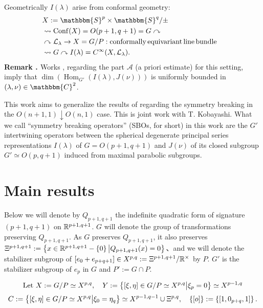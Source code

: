 \documentclass[12pt]{article} %
\newcommand{\assign}{:=}
\newcommand{\tmop}[1]{\ensuremath{\operatorname{#1}}}
\theoremstyle{definition}
\theoremstyle{exampstyle} \newtheorem{examp}[theorem]{Theorem}
\newcommand{\tmtextbf}[1]{{\bfseries{#1}}}
\renewcommand{\setminus}{-}
\begin{document}
 Geometrically $I (\lambda)$ arise from conformal
geometry:
\begin{eqnarray}
  & X \assign \mathbbm{S}^p \times \mathbbm{S}^q / \pm &  \nonumber\\
  & \rightsquigarrow \tmop{Conf} (X) = O (p + 1, q + 1) = G \curvearrowright
  &  \nonumber\\
  & \curvearrowright \mathcal{L}_{\lambda} \rightarrow X = G / P :
  \tmop{conformally} \tmop{equivariant} \tmop{line} \tmop{bundle} & 
  \nonumber\\
  & \rightsquigarrow G \curvearrowright I (\lambda) = C^{\infty} (X,
  \mathcal{L}_{\lambda}) . &  \nonumber
\end{eqnarray}
{\noindent}\tmtextbf{Remark . }Works {\cite{kobayashi2013finite}},
{\cite{kobayashi2014classification}} regarding the part $\mathcal{A}$ (a
priori estimate) for this setting, imply that $\dim (\tmop{Hom}_{G'} (I
(\lambda), J (\nu)))$ is uniformly bounded in $(\lambda, \nu) \in
\mathbbm{C}^2$.{\hspace*{\fill}}{\medskip}


\begin{spacing}{0.8}
	This work aims to generalize the results of \cite{kobayashi2015symmetry}
	regarding the symmetry breaking in the $O(n+1,1)\downarrow O(n,1)$ case. This is joint work with T. Kobayashi.
	What we call ``symmetry breaking operators'' (SBOs, for short) in this work are the $G'$ intertwining operators between the spherical degenerate principal series representations $I(\lambda)$
	of $G=O(p+1,q+1)$ and $J(\nu)$ of its closed subgroup $G'\simeq O(p,q+1)$ induced from maximal parabolic subgroups.
\end{spacing}

\section{Main results}
Below we will denote by $Q_{p+1,q+1}$ the indefinite quadratic form of signature $(p+1,q+1)$ on $\mathbb{R}^{p+1,q+1}$.
$G$ will denote the group of transformations preserving $Q_{p+1,q+1}$. As $G$ preserves $Q_{p+1,q+1}$, it also preserves
$\Xi^{p+1,q+1}:=\mysetn{x\in\R^{p+1,q+1}\setminus\left\{ 0 \right\}}{Q_{p+1,q+1}(x)=0}$、and we will denote the stabilizer subgroup of 
$[e_0+e_{p+q+1}]\in X^{p,q}:=\Xi^{p+1,q+1}/\mathbb{R}^{\times}$ by
$P$. $G'$ is the stabilizer subgroup of $e_p$ in $G$ and $P':=G\cap P$.

\[
	\mbox{Let }X:=G/P\simeq X^{p,q},\quad Y:=\left\{[\xi,\eta]\in G/P\simeq X^{p,q}\big| \xi_{p}=0\right\}\simeq X^{p-1,q}\]
	\[C:=\left\{[\xi,\eta]\in G/P\simeq X^{p,q}\big| \xi_{0}=\eta_q\right\}\simeq X^{p-1,q-1}\cup\Xi^{p,q},\quad\left\{ [o] \right\}:=\left\{ [1,0_{p+q},1] \right\}.
  \]
\end{document}
